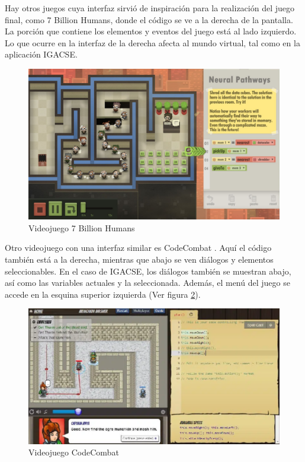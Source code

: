 Hay otros juegos cuya interfaz sirvió de inspiración para la realización del juego final, como 7 Billion Humans\cite{7billionhumans}, donde el código se ve a la derecha de la pantalla. La porción que contiene los elementos y eventos del juego está al lado izquierdo. Lo que ocurre en la interfaz de la derecha afecta al mundo virtual, tal como en la aplicación IGACSE.

\begin{figure}[h]
	\centering
	\includegraphics[scale=0.3]{imagenes/7BillionHumans.png}
	\caption{Videojuego 7 Billion Humans}
	\label{7BillionHumans}
\end{figure}


Otro videojuego con una interfaz similar es CodeCombat \cite{CodeCombat}. Aquí el código también está a la derecha, mientras que abajo se ven diálogos y elementos seleccionables. En el caso de IGACSE, los diálogos también se muestran abajo, así como las variables actuales y la seleccionada.
Además, el menú del juego se accede en la esquina superior izquierda (Ver figura \ref{CodeCombat}).

\begin{figure}[h]
	\centering
	\includegraphics[scale=0.3]{imagenes/CodeCombat.png}
	\caption{Videojuego CodeCombat}
	\label{CodeCombat}
\end{figure}


